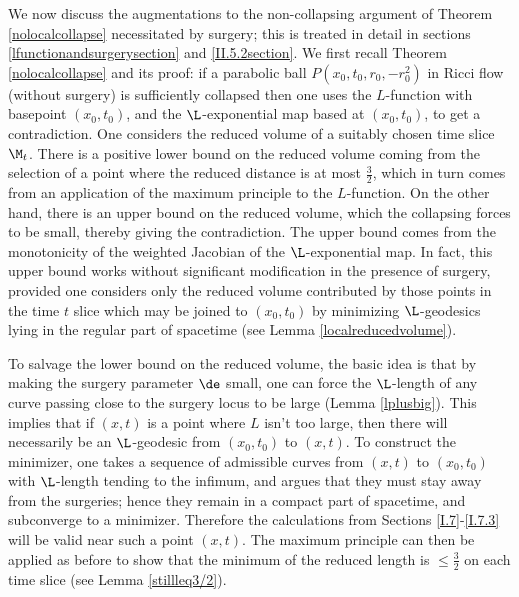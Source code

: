 We now discuss the augmentations to the non-collapsing argument
of Theorem \ref{nolocalcollapse} necessitated by surgery; this is treated in detail in sections
\ref{lfunctionandsurgerysection} and \ref{II.5.2section}.
We first recall Theorem \ref{nolocalcollapse} and its proof:
  if a parabolic ball $P(x_0,t_0,r_0,-r_0^2)$
in Ricci flow (without surgery) is
sufficiently collapsed then one
uses the $L$-function
with basepoint $(x_0,t_0)$, and the $\L$-exponential map based
at $(x_0,t_0)$, to get a contradiction.   One considers the reduced
volume of a suitably chosen time slice $\M_t$. There is a
positive lower bound on the reduced volume coming
from the selection of a point where the reduced distance
is at most $\frac{3}{2}$, which in turn comes from an application of the
maximum principle to the $L$-function. On the other hand, there
is an upper bound on the reduced volume, which the collapsing
forces to be small, thereby giving the contradiction. The upper bound comes
from the monotonicity of the weighted Jacobian of the $\L$-exponential
map.   In fact,  this upper bound works without
significant modification  in the presence of surgery,
provided one considers only the reduced volume contributed
by those points in the time $t$ slice
which may be joined to $(x_0,t_0)$ by minimizing $\L$-geodesics
lying in the regular part of spacetime (see Lemma \ref{localreducedvolume}).

To salvage the lower bound on the reduced volume, the basic idea is that
by making the surgery parameter $\de$ small, one can force the
$\L$-length of any curve passing close to the surgery locus to
be large (Lemma \ref{lplusbig}).   This implies that if $(x,t)$ is a point where $L$
isn't too large, then there will  necessarily be an
$\L$-geodesic from $(x_0,t_0)$ to $(x,t)$.  To construct
the minimizer, one takes  a sequence of admissible curves
from $(x,t)$ to $(x_0,t_0)$ with
$\L$-length tending to the infimum, and argues that they must stay away from the
surgeries; hence
they remain in a compact part of
spacetime, and subconverge to a minimizer.
Therefore the calculations
from Sections \ref{I.7}-\ref{I.7.3}
will be valid near such a point $(x,t)$. The
maximum principle can then be applied as before
to show that the minimum of the reduced
length is $\leq \frac{3}{2}$ on each time slice (see Lemma \ref{stillleq3/2}).

